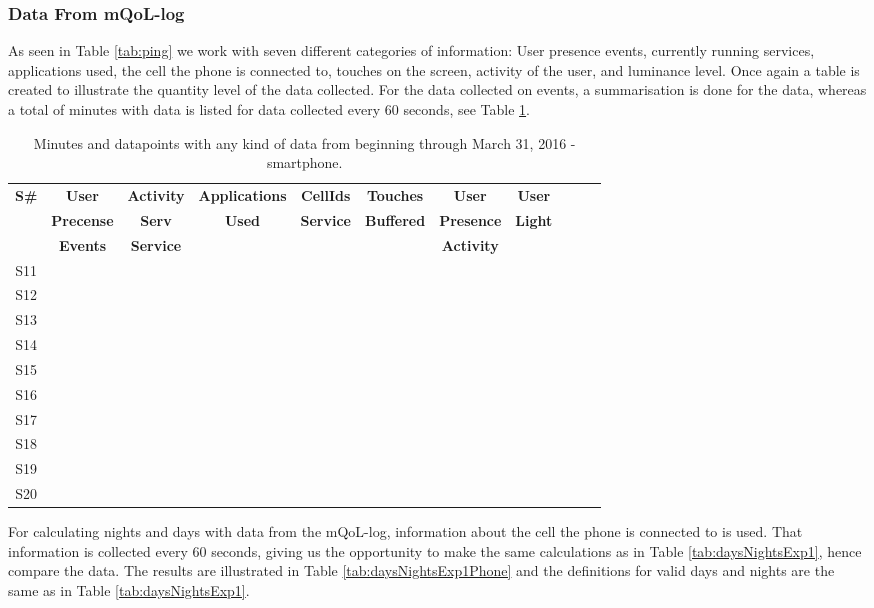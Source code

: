 \documentclass[12pt]{article} %
\begin{document}
\newpage
\subsubsection{Data From mQoL-log}
As seen in Table \ref{tab:ping} we work with seven different categories of information: User presence events, currently running services, applications used, the cell the phone is connected to, touches on the screen, activity of the user, and luminance level. Once again a table is created to illustrate the quantity level of the data collected. For the data collected on events, a summarisation is done for the data, whereas a total of minutes with data is listed for data collected every 60 seconds, see Table \ref{tab:totalMinutesPhone}. 

\begin{table}[H]
\center
\begin{footnotesize}
	\begin{tabular}{| c || c | c | c | c | c | c | c | c | c | c |}
	\hline
	\textbf{S\#} & \textbf{User} & \textbf{Activity} & \textbf{Applications} & \textbf{CellIds} & \textbf{Touches} & \textbf{User} & \textbf{User}\\
	
	& \textbf{Precense} & \textbf{Serv} & \textbf{Used} & \textbf{Service} & \textbf{Buffered} & \textbf{Presence} &\textbf{Light} \\
	
	& \textbf{Events} & \textbf{Service} & & & & \textbf{Activity} & \\
	\hline
	S11 & & & & & & &\\
	S12 & & & & & & &\\
	S13 & & & & & & &\\
	S14 & & & & & & &\\
	S15 & & & & & & &\\
	S16 & & & & & & &\\
	S17 & & & & & & &\\
	S18 & & & & & & &\\
	S19 & & & & & & &\\
	S20 & & & & & & &\\
	\hline
	\end{tabular}
	\caption{Minutes and datapoints with any kind of data from beginning through March 31, 2016 - smartphone.}
	\label{tab:totalMinutesPhone}
\end{footnotesize}
\end{table}

For calculating nights and days with data from the mQoL-log, information about the cell the phone is connected to is used. That information is collected every 60 seconds, giving us the opportunity to make the same calculations as in Table \ref{tab:daysNightsExp1}, hence compare the data. The results are illustrated in Table \ref{tab:daysNightsExp1Phone} and the definitions for valid days and nights are the same as in Table \ref{tab:daysNightsExp1}.
\end{document}
